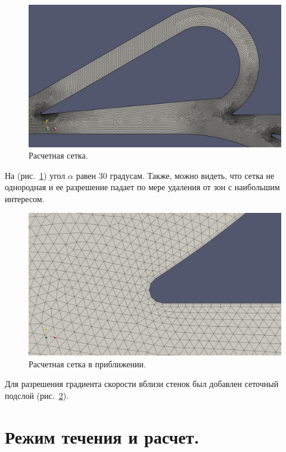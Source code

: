 \documentclass[14pt,a4paper]{article}
\begin{document}
        \begin{figure}[h!]
            \centering
            \includegraphics[width = 1\linewidth]{teslaMesh1}
            \caption{Расчетная сетка.}
            \label{fig:teslaMesh}
        \end{figure}
        
        На (рис.~\ref{fig:teslaMesh}) угол $\alpha$ равен 30 градусам. Также, можно видеть, что сетка не однородная и ее разрешение падает по мере удаления от зон с наибольшим интересом.
        
        \begin{figure}[H]
            \centering
            \includegraphics[width = 1\linewidth]{teslaMesh2}
            \caption{Расчетная сетка в приближении.}
            \label{fig:teslaMesh2}
        \end{figure}   
             
        Для разрешения градиента скорости вблизи стенок был добавлен сеточный подслой (рис.~\ref{fig:teslaMesh2}).
        
    \section*{Режим течения и расчет.}        
        
\end{document}
